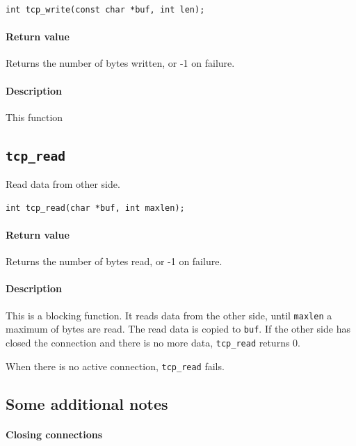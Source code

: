 \documentclass[11pt]{article}
\begin{document}
\begin{lstlisting}
int tcp_write(const char *buf, int len);
\end{lstlisting}

\paragraph{Return value}

Returns the number of bytes written, or -1 on failure.

\paragraph{Description}

This function 


\subsection{\lstinline{tcp_read}}

Read data from other side.

\begin{lstlisting}
int tcp_read(char *buf, int maxlen);
\end{lstlisting}

\paragraph{Return value}

Returns the number of bytes read, or -1 on failure.

\paragraph{Description}

This is a blocking function. It reads data from the other side, until
\lstinline|maxlen| a maximum of bytes are read. The read data is copied to
\lstinline|buf|. If the other side has closed the connection and there is no
more data, \lstinline|tcp_read| returns 0.

When there is no active connection, \lstinline|tcp_read| fails.


\subsection{Some additional notes}

\paragraph{Closing connections}
\end{document}
